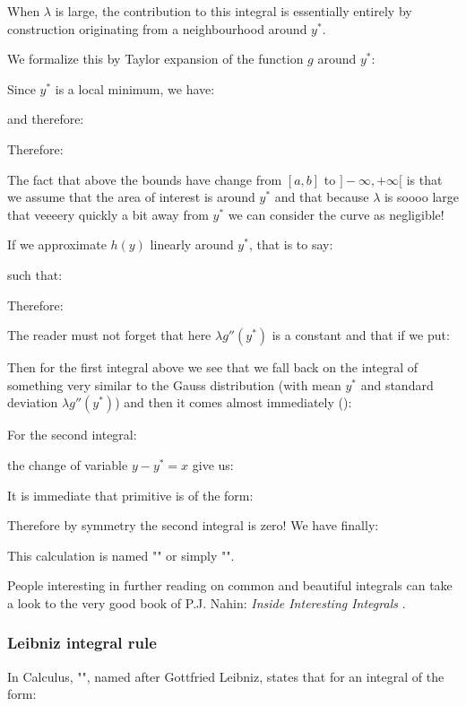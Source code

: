 \begin{enumerate}
		When $\lambda$ is large, the contribution to this integral is essentially entirely by construction originating from a neighbourhood around $y^*$.
		
		We formalize this by Taylor expansion of the function $g$ around $y^*$:
		
		Since $y^*$ is a local minimum, we have:
		
		 and therefore:
		
		Therefore:
		
		The fact that above the bounds have change from $[a,b]$ to $]-\infty,+\infty[$ is that we assume that the area of interest is around $y^*$ and that because $\lambda$ is soooo large that veeeery quickly a bit away from $y^*$ we can consider the curve as negligible!
		
		If we approximate $h(y)$ linearly around $y^*$, that is to say:
		
		such that:
		
		Therefore:
		
		The reader must not forget that here $\lambda g''(y^*)$ is a constant and that if we put:
		
		Then for the first integral above we see that we fall back on the integral of something very similar to the Gauss distribution (with mean $y^*$ and standard deviation $\lambda g''(y^*)$) and then it comes almost immediately ():
		
		For the second integral:
		
		the change of variable $y-y^*=x$ give us:
		
		It is immediate that primitive is of the form:
		
		Therefore by symmetry the second integral is zero! We have finally:
		
		This calculation is named "\label{laplace method of integration}" or simply "".
	\end{enumerate}
	
	\begin{tcolorbox}[title=Remark,colframe=black,arc=10pt]
	People interesting in further reading on common and beautiful integrals can take a look to the very good book of P.J. Nahin: \textit{Inside Interesting Integrals} \cite{nahin2014inside}.
	\end{tcolorbox}	
	
	\subsubsection{Leibniz integral rule}
	In Calculus, "\label{Leibniz's integral rule}", named after Gottfried Leibniz, states that for an integral of the form:
	
